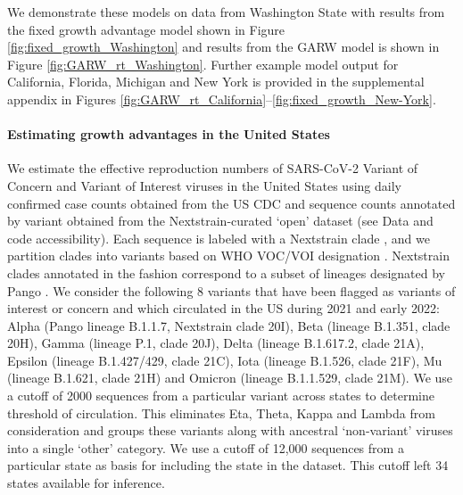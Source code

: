 We demonstrate these models on data from Washington State with results from the fixed growth advantage model shown in Figure \ref{fig:fixed_growth_Washington} and results from the GARW model is shown in Figure \ref{fig:GARW_rt_Washington}.
Further example model output for California, Florida, Michigan and New York is provided in the supplemental appendix in Figures \ref{fig:GARW_rt_California}--\ref{fig:fixed_growth_New-York}.

\paragraph{Estimating growth advantages in the United States}

We estimate the effective reproduction numbers of SARS-CoV-2 Variant of Concern and Variant of Interest viruses in the United States using daily confirmed case counts obtained from the US CDC and sequence counts annotated by variant obtained from the Nextstrain-curated `open' dataset \cite{Hadfield2018} (see Data and code accessibility).
Each sequence is labeled with a Nextstrain clade \cite{Hadfield2018}, and we partition clades into variants based on WHO VOC/VOI designation \cite{Konings2021}.
Nextstrain clades annotated in the fashion correspond to a subset of lineages designated by Pango \cite{Rambaut2020}.
We consider the following 8 variants that have been flagged as variants of interest or concern and which circulated in the US during 2021 and early 2022: Alpha (Pango lineage B.1.1.7, Nextstrain clade 20I), Beta (lineage B.1.351, clade 20H), Gamma (lineage P.1, clade 20J), Delta (lineage B.1.617.2, clade 21A), Epsilon (lineage B.1.427/429, clade 21C), Iota (lineage B.1.526, clade 21F), Mu (lineage B.1.621, clade 21H) and Omicron (lineage B.1.1.529, clade 21M).
We use a cutoff of 2000 sequences from a particular variant across states to determine threshold of circulation.
This eliminates Eta, Theta, Kappa and Lambda from consideration and groups these variants along with ancestral `non-variant' viruses into a single `other' category.
We use a cutoff of 12,000 sequences from a particular state as basis for including the state in the dataset.
This cutoff left 34 states available for inference.

